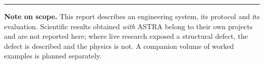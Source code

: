 \documentclass[11pt,a4paper]{article}
\begin{document}
\vspace{4mm}
\hrule
\vspace{2mm}
\noindent\footnotesize
\textbf{Note on scope.} This report describes an engineering system, its
protocol and its evaluation. Scientific results obtained \emph{with} ASTRA
belong to their own projects and are not reported here; where live research
exposed a structural defect, the defect is described and the physics is not.
A companion volume of worked examples is planned separately.
\end{document}
